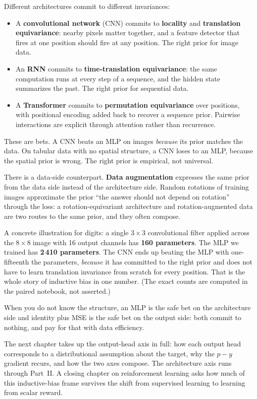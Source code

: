 Different architectures commit to different invariances:

\begin{itemize}
\item A \textbf{convolutional network} (CNN) commits to \textbf{locality}
  and \textbf{translation equivariance}: nearby pixels matter together,
  and a feature detector that fires at one position should fire at any
  position. The right prior for image data.
\item An \textbf{RNN} commits to \textbf{time-translation equivariance}:
  the same computation runs at every step of a sequence, and the hidden
  state summarizes the past. The right prior for sequential data.
\item A \textbf{Transformer} commits to \textbf{permutation equivariance}
  over positions, with positional encoding added back to recover a
  sequence prior. Pairwise interactions are explicit through attention
  rather than recurrence.
\end{itemize}

These are bets. A CNN beats an MLP on images \emph{because} its prior
matches the data. On tabular data with no spatial structure, a CNN loses
to an MLP, because the spatial prior is wrong. The right prior is
empirical, not universal.

There is a data-side counterpart. \textbf{Data augmentation} expresses
the same prior from the data side instead of the architecture side.
Random rotations of training images approximate the prior ``the answer
should not depend on rotation'' through the loss: a rotation-equivariant
architecture and rotation-augmented data are two routes to the same
prior, and they often compose.

A concrete illustration for digits: a single $3 \times 3$ convolutional
filter applied across the $8 \times 8$ image with 16 output channels has
\textbf{160 parameters}. The MLP we trained has \textbf{2\,410
parameters}. The CNN ends up beating the MLP with one-fifteenth the
parameters, \emph{because} it has committed to the right prior and does
not have to learn translation invariance from scratch for every position.
That is the whole story of inductive bias in one number. (The exact
counts are computed in the paired notebook, not asserted.)

When you do not know the structure, an MLP is the safe bet on the
architecture side and identity plus MSE is the safe bet on the output
side: both commit to nothing, and pay for that with data efficiency.

The next chapter takes up the output-head axis in full: how each output
head corresponds to a distributional assumption about the target, why the
$p - y$ gradient recurs, and how the two axes compose. The architecture
axis runs through Part~II. A closing chapter on reinforcement learning
asks how much of this inductive-bias frame survives the shift from
supervised learning to learning from scalar reward.
